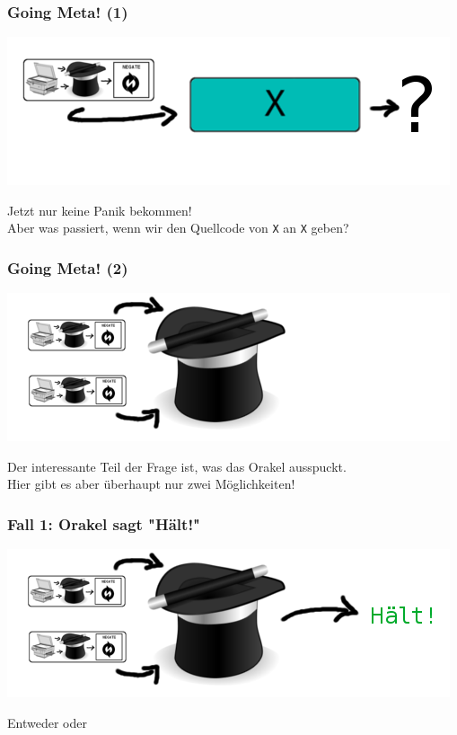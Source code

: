\documentclass[aspectratio=43]{beamer}
\begin{document}

\begin{frame}
\frametitle{Going Meta! (1)}
\begin{center}
\includegraphics[scale=1.4]{images/input.png} 
\bigskip

Jetzt nur keine Panik bekommen!\\

Aber was passiert, wenn wir den Quellcode von \texttt{X} an \texttt{X} geben?
\end{center}
\end{frame}


\begin{frame}
\frametitle{Going Meta! (2)}

\begin{center}
\includegraphics[scale=1.4]{images/input_hat_nothing.png} 
\bigskip

Der interessante Teil der Frage ist, was das Orakel ausspuckt.\\
Hier gibt es aber überhaupt nur zwei Möglichkeiten!
\end{center}
\end{frame}


\begin{frame}
\frametitle{Fall 1: Orakel sagt "Hält!"}

\begin{center}
\includegraphics[scale=1.4]{images/input_hat_halts.png} 
\bigskip

Entweder 
oder
\end{center}
\end{frame}
\end{document}
